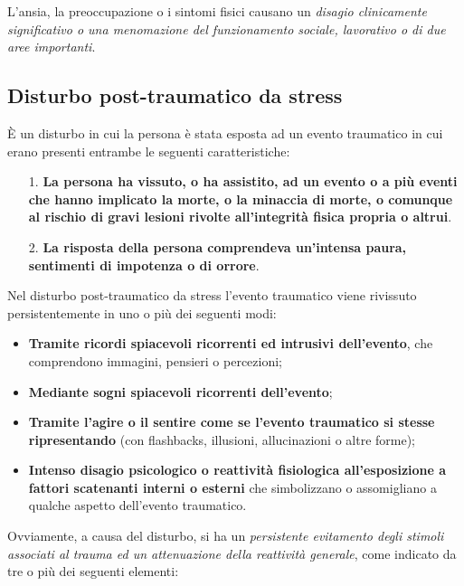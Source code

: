 L'ansia, la preoccupazione o i sintomi fisici causano un \emph{disagio
clinicamente significativo o una menomazione del funzionamento sociale,
lavorativo o di due aree importanti}.

\subsection{Disturbo post-traumatico da stress}

È un disturbo in cui la persona è stata esposta ad un evento traumatico
in cui erano presenti entrambe le seguenti caratteristiche:

\begin{itemize}
\item[1.]
  \textbf{La persona ha vissuto, o ha assistito, ad un evento o a più
  eventi che hanno implicato la morte, o la minaccia di morte, o
  comunque al rischio di gravi lesioni rivolte all'integrità fisica
  propria o altrui}.
\item[2.]
  \textbf{La risposta della persona comprendeva un'intensa paura,
  sentimenti di impotenza o di orrore}.
\end{itemize}

Nel disturbo post-traumatico da stress l'evento traumatico viene
rivissuto persistentemente in uno o più dei seguenti modi:

\begin{itemize}
\item
  \textbf{Tramite ricordi spiacevoli ricorrenti ed intrusivi
  dell'evento}, che comprendono immagini, pensieri o percezioni;
\item
  \textbf{Mediante sogni spiacevoli ricorrenti dell'evento};
\item
  \textbf{Tramite l'agire o il sentire come se l'evento traumatico si
  stesse ripresentando} (con flashbacks, illusioni, allucinazioni o
  altre forme);
\item
  \textbf{Intenso disagio psicologico o reattività fisiologica
  all'esposizione a fattori scatenanti interni o esterni} che
  simbolizzano o assomigliano a qualche aspetto dell'evento traumatico.
\end{itemize}

Ovviamente, a causa del disturbo, si ha un \emph{persistente evitamento
degli stimoli associati al trauma ed un attenuazione della reattività
generale}, come indicato da tre o più dei seguenti elementi:

